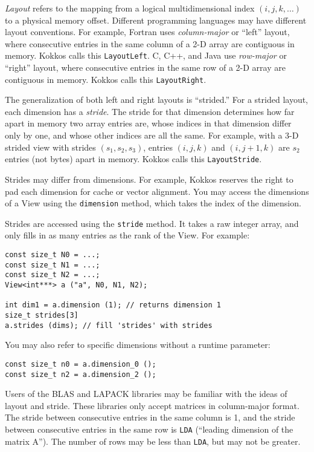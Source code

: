 \emph{Layout} refers to the mapping from a logical multidimensional
index $(i, j, k, \dots)$ to a physical memory offset.  Different
programming languages may have different layout conventions.  For
example, Fortran uses \emph{column-major} or ``left'' layout, where
consecutive entries in the same column of a 2-D array are contiguous
in memory.  Kokkos calls this \lstinline!LayoutLeft!.  C, C++, and Java use
\emph{row-major} or ``right'' layout, where consecutive entries in the
same row of a 2-D array are contiguous in memory.  Kokkos calls this
\lstinline!LayoutRight!.

The generalization of both left and right layouts is ``strided.''  For
a strided layout, each dimension has a \emph{stride}.  The stride for
that dimension determines how far apart in memory two array entries
are, whose indices in that dimension differ only by one, and whose
other indices are all the same.  For example, with a 3-D strided view
with strides $(s_1, s_2, s_3)$, entries $(i, j, k)$ and $(i, j+1, k)$
are $s_2$ entries (not bytes) apart in memory.  Kokkos calls this
\lstinline!LayoutStride!.

Strides may differ from dimensions.  For example, Kokkos reserves the
right to pad each dimension for cache or vector alignment.  You may
access the dimensions of a View using the \lstinline!dimension! method,
which takes the index of the dimension.

Strides are accessed using the \lstinline!stride! method.  It takes a raw
integer array, and only fills in as many entries as the rank of the View.
For example:
\begin{lstlisting}
const size_t N0 = ...;
const size_t N1 = ...;
const size_t N2 = ...;
View<int***> a ("a", N0, N1, N2);

int dim1 = a.dimension (1); // returns dimension 1
size_t strides[3]
a.strides (dims); // fill 'strides' with strides
\end{lstlisting}
You may also refer to specific dimensions without a runtime parameter:
\begin{lstlisting}
const size_t n0 = a.dimension_0 ();
const size_t n2 = a.dimension_2 ();
\end{lstlisting}

Users of the BLAS and LAPACK libraries may be familiar with the ideas
of layout and stride.  These libraries only accept matrices in
column-major format.  The stride between consecutive entries in the
same column is 1, and the stride between consecutive entries in the
same row is \lstinline!LDA! (``leading dimension of the matrix A'').  The
number of rows may be less than \lstinline!LDA!, but may not be greater.

